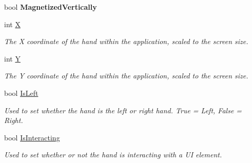 \begin{DoxyCompactItemize}
\item 
\hypertarget{class_microsoft_1_1_samples_1_1_kinect_1_1_basic_interactions_1_1_hand_position_a977434f1089984be0397bc96b951d981}{bool {\bfseries Magnetized\-Vertically}}\label{class_microsoft_1_1_samples_1_1_kinect_1_1_basic_interactions_1_1_hand_position_a977434f1089984be0397bc96b951d981}

\item 
int \hyperlink{class_microsoft_1_1_samples_1_1_kinect_1_1_basic_interactions_1_1_hand_position_adc7748bdb3a2326cfd0f87ebeddb6b93}{X}
\begin{DoxyCompactList}\small\item\em The X coordinate of the hand within the application, scaled to the screen size. \end{DoxyCompactList}\item 
int \hyperlink{class_microsoft_1_1_samples_1_1_kinect_1_1_basic_interactions_1_1_hand_position_a735628a81a3dc632ca4d1ecd109c3c14}{Y}
\begin{DoxyCompactList}\small\item\em The Y coordinate of the hand within the application, scaled to the screen size. \end{DoxyCompactList}\item 
bool \hyperlink{class_microsoft_1_1_samples_1_1_kinect_1_1_basic_interactions_1_1_hand_position_ae9e3aa977c7e7b9ec88906423fc995a9}{Is\-Left}
\begin{DoxyCompactList}\small\item\em Used to set whether the hand is the left or right hand. True = Left, False = Right. \end{DoxyCompactList}\item 
bool \hyperlink{class_microsoft_1_1_samples_1_1_kinect_1_1_basic_interactions_1_1_hand_position_a6dc4ed8d8f34c25c6e9eff3af9199fa5}{Is\-Interacting}
\begin{DoxyCompactList}\small\item\em Used to set whether or not the hand is interacting with a U\-I element. \end{DoxyCompactList}\end{DoxyCompactItemize}
